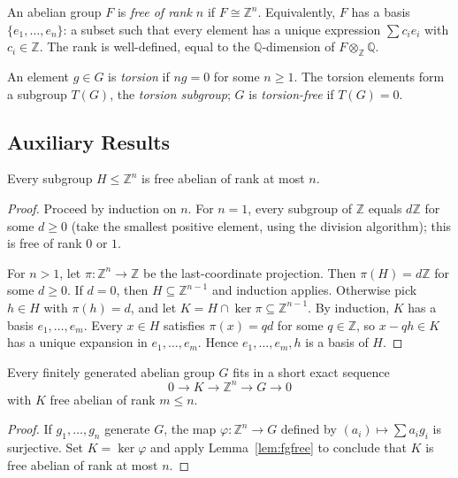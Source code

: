 \begin{definition}
    \label{def:free-abelian}
    An abelian group $F$ is \emph{free of rank $n$} if $F \cong \mathbb{Z}^n$.
    Equivalently, $F$ has a basis $\{e_1, \dots, e_n\}$: a subset such that
    every element has a unique expression $\sum c_i e_i$ with $c_i \in \mathbb{Z}$.
    The rank is well-defined, equal to the $\mathbb{Q}$-dimension of $F \otimes_{\mathbb{Z}} \mathbb{Q}$.
\end{definition}

\begin{definition}
    \label{def:torsion}
    An element $g \in G$ is \emph{torsion} if $n g = 0$ for some $n \ge 1$.
    The torsion elements form a subgroup $T(G)$, the \emph{torsion subgroup};
    $G$ is \emph{torsion-free} if $T(G) = 0$.
\end{definition}

\subsection{Auxiliary Results}

\begin{lemma}
    \label{lem:fgfree}
    Every subgroup $H \le \mathbb{Z}^n$ is free abelian of rank at most $n$.
\end{lemma}
\begin{proof}
    Proceed by induction on $n$. For $n = 1$, every subgroup of $\mathbb{Z}$ equals
    $d\mathbb{Z}$ for some $d \ge 0$ (take the smallest positive element, using the
    division algorithm); this is free of rank $0$ or $1$.

    For $n > 1$, let $\pi : \mathbb{Z}^n \to \mathbb{Z}$ be the last-coordinate projection.
    Then $\pi(H) = d\mathbb{Z}$ for some $d \ge 0$. If $d = 0$, then
    $H \subseteq \mathbb{Z}^{n-1}$ and induction applies. Otherwise pick $h \in H$
    with $\pi(h) = d$, and let $K = H \cap \ker \pi \subseteq \mathbb{Z}^{n-1}$.
    By induction, $K$ has a basis $e_1, \dots, e_m$. Every $x \in H$ satisfies
    $\pi(x) = q d$ for some $q \in \mathbb{Z}$, so $x - q h \in K$ has a unique
    expansion in $e_1, \dots, e_m$. Hence $e_1, \dots, e_m, h$ is a basis of $H$.
\end{proof}

\begin{lemma}
    \label{lem:pres}
    Every finitely generated abelian group $G$ fits in a short exact sequence
    \[
        0 \to K \to \mathbb{Z}^n \to G \to 0
    \]
    with $K$ free abelian of rank $m \le n$.
\end{lemma}
\begin{proof}
    If $g_1, \dots, g_n$ generate $G$, the map $\varphi : \mathbb{Z}^n \to G$
    defined by $(a_i) \mapsto \sum a_i g_i$ is surjective. Set $K = \ker \varphi$
    and apply Lemma~\ref{lem:fgfree} to conclude that $K$ is free abelian of
    rank at most $n$.
\end{proof}

